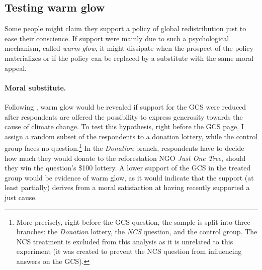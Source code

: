 \documentclass[12pt,english]{article}
\begin{document}
\begin{bibunit}
\subsection{Testing warm glow}\label{subsec:warm_glow}

Some people might claim they support a policy of global redistribution just to ease their conscience. If support were mainly due to such a psychological mechanism, called \textit{warm glow}, it might
dissipate when the prospect of the policy materializes or if the policy can be replaced by a substitute with the same moral appeal.

\paragraph{Moral substitute.}

Following \cite{nunes_identifying_2003}, warm glow would be revealed if support for the GCS were reduced after respondents are offered the possibility to express generosity towards the cause of climate change. To test this hypothesis, right before the GCS page, I assign a random subset of the respondents to a donation lottery, while the control group faces no question.\footnote{More precisely, right before the GCS question, the sample is split into three branches: the \textit{Donation} lottery, the \textit{NCS} question, and the control group. The NCS treatment is excluded from this analysis as it is unrelated to this experiment (it was created to prevent the NCS question from influencing answers on the GCS).} 
In the \textit{Donation} branch, respondents have to decide how much they would donate to the reforestation NGO \textit{Just One Tree}, should they win the question's \$100 lottery. 
A lower support of the GCS in the treated group would be evidence of warm glow, as it would indicate that the support (at least partially) derives from a moral satisfaction at having recently supported a just cause. 


\end{bibunit}
\end{document}
